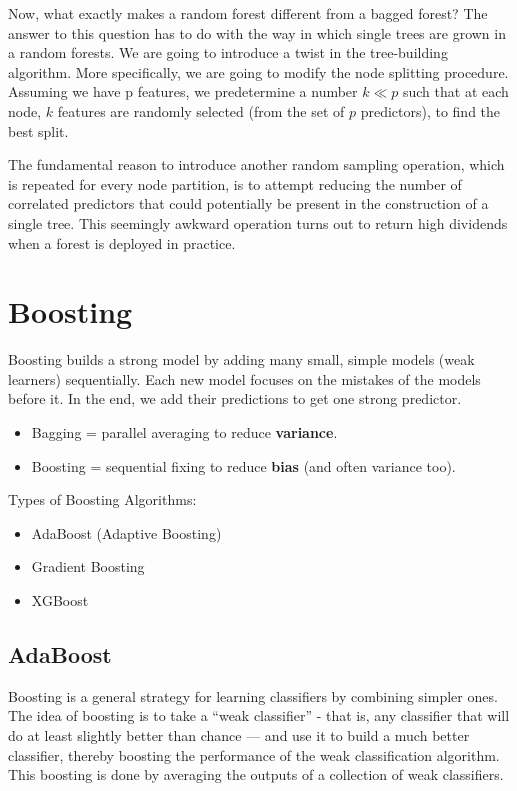 Now, what exactly makes a random forest different from a bagged forest? The answer to this question has to do with the way in which single trees are grown in a random forests. We are going to introduce a twist in the tree-building algorithm. More specifically, we are going to modify the node splitting procedure. Assuming we have p features, we predetermine a number $k\ll p$ such that at each node, $k$ features are randomly selected (from the set of $p$ predictors), to find the best split.

The fundamental reason to introduce another random sampling operation, which is repeated for every node partition, is to attempt reducing the number of correlated predictors that could potentially be present in the construction of a single tree. This seemingly awkward operation turns out to return high dividends when a forest is deployed in practice.

\section{Boosting}

Boosting builds a strong model by adding many small, simple models (weak learners) sequentially. Each new model focuses on the mistakes of the models before it. In the end, we add their predictions to get one strong predictor.

\begin{itemize}
	\item Bagging = parallel averaging to reduce \textbf{variance}.
	\item Boosting = sequential fixing to reduce \textbf{bias} (and often variance too).
\end{itemize}

Types of Boosting Algorithms:
\begin{itemize}
	\item AdaBoost (Adaptive Boosting)
	\item Gradient Boosting
	\item XGBoost
\end{itemize}

\subsection{AdaBoost}

Boosting is a general strategy for learning classifiers by combining simpler ones. The idea of boosting is to take a ``weak classifier'' - that is, any classifier that will do at least slightly better than chance — and use it to build a much better classifier, thereby boosting the performance of the weak classification algorithm. This boosting is done by averaging the outputs of a collection of weak classifiers. 

